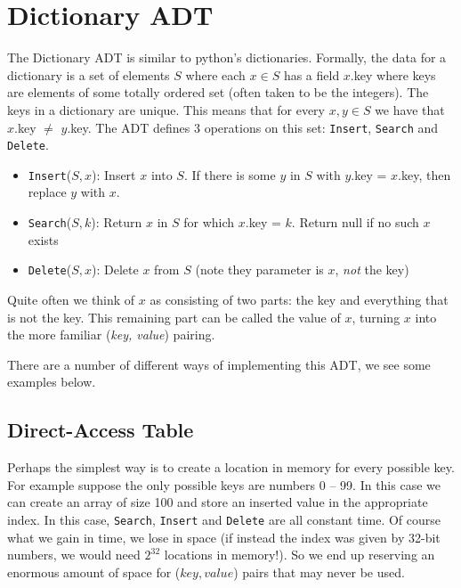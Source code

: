 \section{Dictionary ADT}
The Dictionary ADT is similar to python's dictionaries. Formally, the data for a dictionary is a set of elements $S$ where each $x \in S$ has a field $x.$key where keys are elements of some totally ordered set (often taken to be the integers). The keys in a dictionary are unique. This means that for every $x, y \in S$ we have that $x.$key $\neq$ $y.$key. The ADT defines 3 operations on this set: \texttt{Insert}, \texttt{Search} and \texttt{Delete}.
\begin{itemize}
    \item \texttt{Insert}($S, x$): Insert $x$ into $S$. If there is some $y$ in $S$ with $y.$key = $x.$key, then replace $y$ with $x$.
    \item \texttt{Search}($S, k$): Return $x$ in $S$ for which $x.$key = $k$. Return null if no such $x$ exists
    \item \texttt{Delete}($S, x$): Delete $x$ from $S$ (note they parameter is $x$, \textit{not} the key)
\end{itemize}

Quite often we think of $x$ as consisting of two parts: the key and everything that is not the key. This remaining part can be called the value of $x$, turning $x$ into the more familiar (\textit{key, value}) pairing.

There are a number of different ways of implementing this ADT, we see some examples below.

\subsection{Direct-Access Table}
Perhaps the simplest way is to create a location in memory for every possible key. For example suppose the only possible keys are numbers 0 -- 99. In this case we can create an array of size 100 and store an inserted value in the appropriate index. In this case, \texttt{Search}, \texttt{Insert} and \texttt{Delete} are all constant time. Of course what we gain in time, we lose in space (if instead the index was given by 32-bit numbers, we would need $2^{32}$ locations in memory!). So we end up reserving an enormous amount of space for ($key, value$) pairs that may never be used.

